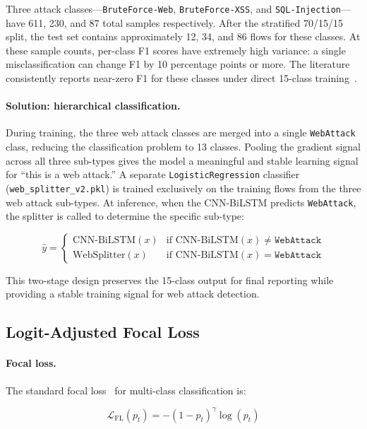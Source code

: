 \documentclass[12pt]{article}
\theoremstyle{plain}
\begin{document}
Three attack classes—\texttt{BruteForce-Web}, \texttt{BruteForce-XSS}, and \texttt{SQL-Injection}—have 611, 230, and 87 total samples respectively. After the stratified 70/15/15 split, the test set contains approximately 12, 34, and 86 flows for these classes. At these sample counts, per-class F1 scores have extremely high variance: a single misclassification can change F1 by 10 percentage points or more. The literature consistently reports near-zero F1 for these classes under direct 15-class training~\cite{Gocs2024}.

\paragraph{Solution: hierarchical classification.} During training, the three web attack classes are merged into a single \texttt{WebAttack} class, reducing the classification problem to 13 classes. Pooling the gradient signal across all three sub-types gives the model a meaningful and stable learning signal for ``this is a web attack.'' A separate \texttt{LogisticRegression} classifier (\texttt{web\_splitter\_v2.pkl}) is trained exclusively on the training flows from the three web attack sub-types. At inference, when the CNN-BiLSTM predicts \texttt{WebAttack}, the splitter is called to determine the specific sub-type:

\begin{equation}
\hat{y} = \begin{cases}
\text{CNN-BiLSTM}(x) & \text{if CNN-BiLSTM}(x) \neq \texttt{WebAttack} \\
\text{WebSplitter}(x) & \text{if CNN-BiLSTM}(x) = \texttt{WebAttack}
\end{cases}
\end{equation}

This two-stage design preserves the 15-class output for final reporting while providing a stable training signal for web attack detection.

\subsection{Logit-Adjusted Focal Loss}
\label{sec:la}

\paragraph{Focal loss.} The standard focal loss~\cite{Lin2017} for multi-class classification is:

\begin{equation}
\mathcal{L}_{\text{FL}}(p_t) = -(1 - p_t)^{\gamma} \log(p_t)
\label{eq:focal}
\end{equation}
\end{document}
